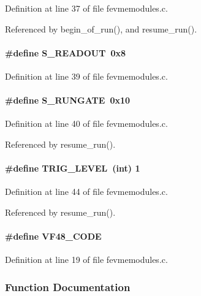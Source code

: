 Definition at line 37 of file fevmemodules.c.

Referenced by begin\_\-of\_\-run(), and resume\_\-run().
\paragraph[{S\_\-READOUT}]{\setlength{\rightskip}{0pt plus 5cm}\#define S\_\-READOUT~0x8}\hfill\label{fevmemodules_8c_af89ae631a74234ea7f55a6d3767eb8cc}


Definition at line 39 of file fevmemodules.c.
\paragraph[{S\_\-RUNGATE}]{\setlength{\rightskip}{0pt plus 5cm}\#define S\_\-RUNGATE~0x10}\hfill\label{fevmemodules_8c_a1218cb0e8300322e213dcc9e94677c13}


Definition at line 40 of file fevmemodules.c.

Referenced by resume\_\-run().
\paragraph[{TRIG\_\-LEVEL}]{\setlength{\rightskip}{0pt plus 5cm}\#define TRIG\_\-LEVEL~(int) 1}\hfill\label{fevmemodules_8c_a90a84f3ea9d75594c6cde52a179b5e88}


Definition at line 44 of file fevmemodules.c.

Referenced by resume\_\-run().
\paragraph[{VF48\_\-CODE}]{\setlength{\rightskip}{0pt plus 5cm}\#define VF48\_\-CODE}\hfill\label{fevmemodules_8c_a12a02425f79527aa8cf10894e2d0e0d6}


Definition at line 19 of file fevmemodules.c.

\subsubsection{Function Documentation}
